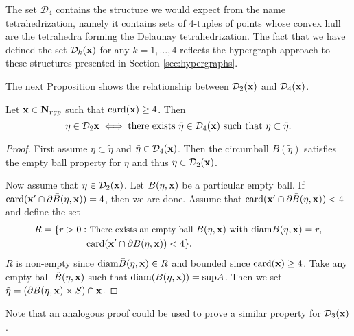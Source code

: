 The set $\mathcal D_4$ contains the structure we would expect from the name tetrahedrization, namely it contains sets of 4-tuples of points whose convex hull are the tetrahedra  forming the Delaunay tetrahedrization. The fact that we have defined the set $\mathcal D_k({\mathbf{x}})$ for any $k=1,\dots,4$ reflects the hypergraph approach to these structures presented in Section \ref{sec:hypergraphs}.

The next Proposition shows the relationship between $\mathcal D_2({\mathbf{x}})$ and $\mathcal D_4({\mathbf{x}})$.
\begin{proposition}\label{prop:d2d4}
	Let ${\mathbf{x}}\in\mathbf N_{rgp}$ such that $\mathrm{card}({\mathbf{x}})\geq 4$. Then
	$$\eta \in \mathcal D_2{{\mathbf{x}}} \iff \text{there exists } \tilde\eta \in \mathcal D_4({\mathbf{x}}) \text{ such that } \eta\subset \tilde \eta.$$
\end{proposition}
\begin{proof}
	First assume $\eta \subset \tilde \eta$ and $\tilde\eta \in \mathcal D_4({\mathbf{x}})$. Then the circumball $B(\tilde\eta)$ satisfies the empty ball property for $\eta$ and thus $\eta \in \mathcal D_2({\mathbf{x}})$.

	Now assume that $\eta \in \mathcal D_2({\mathbf{x}})$. Let $\bar B(\eta,{\mathbf{x}})$ be a particular empty ball. If $\mathrm{card}({\mathbf{x}}'\cap \partial \bar B(\eta,{\mathbf{x}})) = 4$, then we are done. Assume that $\mathrm{card}({\mathbf{x}}'\cap \partial \bar B(\eta,{\mathbf{x}})) < 4$ and define the set
	\begin{align*} R = \{r>0: & \text{ \small{There exists an empty ball} } B(\eta,{\mathbf{x}}) \text{ with } \mathrm{diam}B(\eta,{\mathbf{x}})=r, \\
		& \mathrm{card}({\mathbf{x}}'\cap \partial B(\eta,{\mathbf{x}})) < 4 \}.
	\end{align*}
	$R$ is non-empty since $\mathrm{diam}\bar B(\eta,{\mathbf{x}}) \in R$ and bounded since $\mathrm{card}({\mathbf{x}})\geq 4$. Take any empty ball $\tilde B(\eta,{\mathbf{x}})$ such that $\mathrm{diam}(B(\eta,{\mathbf{x}})) = \mathrm{sup} A$. Then we set $\tilde\eta = (\partial \tilde B(\eta,{\mathbf{x}}) \times S)\cap {\mathbf{x}}$.   
\end{proof}
Note that an analogous proof could be used to prove a similar property for $\mathcal D_3({\mathbf{x}})$.\newline


